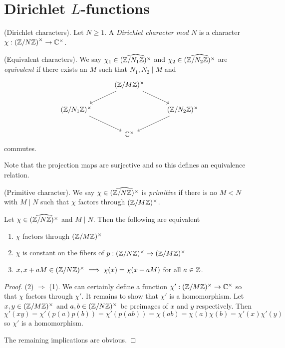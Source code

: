 \documentclass{memoir}
\begin{document}
\section{Dirichlet $L$-functions}
\begin{definition}
    (Dirichlet characters).
    Let $N\ge1$. 
    A \textit{Dirichlet character mod $N$} is a character $\chi:\left(\mathbb{Z}/N\mathbb{Z}\right)^\times \to \mathbb{C}^\times$.
\end{definition}
\begin{definition}
    (Equivalent characters).
    We say $\chi_1\in\widehat{(\mathbb{Z}/N_1\mathbb{Z})^\times}$ and $\chi_2\in\widehat{(\mathbb{Z}/N_2\mathbb{Z})^\times}$ are \textit{equivalent} if there exists an $M$ such that $N_1,N_2\mid M$ and 
    \begin{equation}
        \begin{tikzcd}
            & (\Z/M\Z)^\times \arrow[dl] \arrow[dr]& \\
            (\Z/N_1\Z)^\times \arrow[dr] & & (\Z/N_2\Z)^\times \arrow[dl] \\
                            & \C^\times &
        \end{tikzcd}
    \end{equation}
    commutes.
\end{definition}
Note that the projection maps are surjective and so this defines an equivalence relation.
\begin{definition}
    (Primitive character).
    We say $\chi \in \widehat{(\mathbb{Z}/N\mathbb{Z})^\times}$ is \textit{primitive} if there is no $M<N$ with $M\mid N$ such that $\chi$ factors through $(\mathbb{Z}/M\mathbb{Z})^\times$.
\end{definition}
\begin{lemma}
    Let $\chi\in\widehat{(\mathbb{Z}/N\mathbb{Z})^\times}$ and $M\mid N$.
    Then the following are equivalent
    \begin{enumerate}
        \item $\chi$ factors through $(\mathbb{Z}/M\mathbb{Z})^\times$
        \item $\chi$ is constant on the fibers of $p:(\mathbb{Z}/N\mathbb{Z})^\times\to(\mathbb{Z}/M\mathbb{Z})^\times$
        \item $x,x+aM\in(\mathbb{Z}/N\mathbb{Z})^\times \implies \chi(x) = \chi(x+aM)$ for all $a\in \mathbb{Z}$.
    \end{enumerate}
\end{lemma}
\begin{proof}
    (2) $\Rightarrow$ (1).
    We can certainly define a function $\chi':(\mathbb{Z}/M\mathbb{Z})^\times\to\mathbb{C}^\times$ so that $\chi$ factors through $\chi'$.
    It remains to show that $\chi'$ is a homomorphism.
    Let $x,y\in (\mathbb{Z}/M\mathbb{Z})^\times$ and $a,b\in(\mathbb{Z}/N\mathbb{Z})^\times$ be preimages of $x$ and $y$ respectively.
    Then 
    \begin{equation}
        \chi'(xy) = \chi'(p(a)p(b)) = \chi'(p(ab)) = \chi(ab) = \chi(a)\chi(b) = \chi'(x) \chi'(y)
    \end{equation}
    so $\chi'$ is a homomorphism.

    The remaining implications are obvious.
\end{proof}
\end{document}
